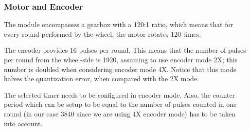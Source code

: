 \documentclass[english]{article}
\begin{document}
\subsubsection{Motor and Encoder}
The module encompasses a gearbox with a 120:1 ratio, which means that for every round performed by the wheel, the motor rotates 120 times. 

The encoder provides 16 pulses per round. This means that the number of pulses per round from the wheel-side is 1920, assuming to use encoder mode 2X; this number is doubled when considering encoder mode 4X. Notice that this mode halves the quantization error, when compared with the 2X mode. 

The selected timer needs to be configured in encoder mode. Also, the counter period which can be setup to be equal to the number of pulses counted in one round (in our case 3840 since we are using 4X encoder mode) has to be taken into account. 
\end{document}
